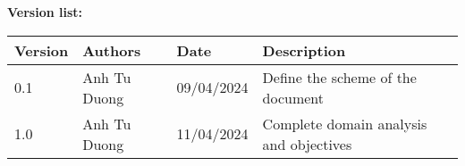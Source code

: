 \textcolor{RFIGreen}{\Large\bf Version list:}


\begin{center}

{\setlength{\extrarowheight}{6pt}
\begin{tabular}{|p{1.5cm}|p{4.5cm}|p{2.5cm}|p{5.5cm}|}
\hline
{\small\bf Version} & {\small\bf Authors} & {\small\bf Date} & {\small\bf Description}\\
\hline
0.1 & Anh Tu Duong & 09/04/2024  & Define the scheme of the document \\
\hline
1.0 & Anh Tu Duong & 11/04/2024  & Complete domain analysis and objectives \\
\end{tabular}
}

\end{center}

\newpage
